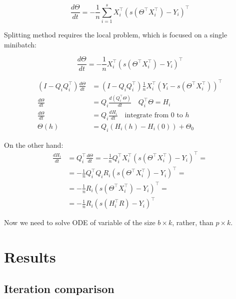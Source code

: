 \documentclass{article}
\begin{document}
\begin{equation}
\frac{d \Theta}{d t} = - \frac{1}{n} \sum_{i=1}^s X_i^\top\left(s(\Theta^\top X_i^\top) - Y_i \right)^\top
\end{equation}

Splitting method requires the local problem, which is focused on a single minibatch:

\begin{equation}
\frac{d \Theta}{d t} = - \frac{1}{n} X_i^\top\left(s(\Theta^\top X_i^\top) - Y_i \right)^\top
\end{equation}

\begin{align}
\nonumber (I - Q_iQ_i^\top)\frac{d \Theta}{d t} &= (I - Q_iQ_i^\top) \frac{1}{n} X_i^\top(Y_i -s(\Theta^\top X_i^\top))^\top \\
\nonumber \frac{d \Theta}{d t} &= Q_i\frac{d (Q_i^\top\Theta)}{d t} \quad Q_i^\top \Theta = H_i \\ 
\nonumber \frac{d \Theta}{d t} &= Q_i\frac{d H_i }{d t} \quad \text{integrate from $0$ to $h$}\\ 
\label{strang:softmax_theta_from_eta}\Theta(h) &= Q_i \left(H_i (h) - H_i (0) \right) + \Theta_0
\end{align}

On the other hand:
\begin{align}\nonumber
\frac{d H_i }{d t} &= Q_i^\top\frac{d \Theta}{d t} =  - \frac{1}{n} Q_i^\top  X_i^\top(s(\Theta^\top X_i^\top) - Y_i)^\top = \\ 
\nonumber&= - \frac{1}{n} Q_i^\top  Q_i R_i(s(\Theta^\top X_i^\top) - Y_i)^\top =\\
\nonumber&= - \frac{1}{n} R_i(s(\Theta^\top X_i^\top) - Y_i)^\top =\\
\nonumber&= - \frac{1}{n} R_i(s(H_i^\top R) - Y_i)^\top 
\end{align}

Now we need to solve ODE of variable of the size $b \times k$, rather, than $p \times k$.



\section{Results}
\subsection{Iteration comparison}
\end{document}
